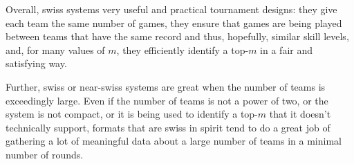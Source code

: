 {    Overall, swiss systems very useful and practical tournament designs: they give each team the same number of games, they ensure that games are being played between teams that have the same record and thus, hopefully, similar skill levels, and, for many values of $m$, they efficiently identify a top-$m$ in a fair and satisfying way.

    Further, swiss or near-swiss systems are great when the number of teams is exceedingly large. Even if the number of teams is not a power of two, or the system is not compact, or it is being used to identify a top-$m$ that it doesn't technically support, formats that are swiss in spirit tend to do a great job of gathering a lot of meaningful data about a large number of teams in a minimal number of rounds.



}








